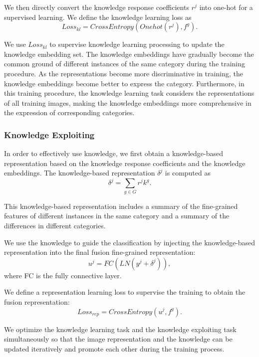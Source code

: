 \documentclass[5p,twocolumn]{elsarticle}
\begin{document}
We then directly convert the knowledge response coefficients $r^j$ into one-hot for a supervised learning. We define the knowledge learning loss as
\begin{equation}\label{equ.lossatte}
Loss_{kl} = CrossEntropy(Onehot(r^j), f^g ).
\end{equation}

We use $Loss_{kl}$ to supervise knowledge learning processing to update the knowledge embedding set.
The knowledge embeddings have gradually become the common ground of different instances of the same category during the training procedure. As the representations become more discriminative in training, the knowledge embeddings become better to express the category. Furthermore, in this training procedure, the knowledge learning task considers the representations of all training images, making the knowledge embeddings more comprehensive in the expression of corresponding categories.

\subsubsection{Knowledge Exploiting}
In order to effectively use knowledge, we first obtain a knowledge-based representation based on the knowledge response coefficients and the knowledge embeddings.
The knowledge-based representation $\delta^{j}$ is computed as 
\begin{equation}\label{equ.atteValue}
\delta^{j} = \sum_{g \in G}r^jk^{g}.
\end{equation}

This knowledge-based representation includes a summary of the fine-grained features of different instances in the same category and a summary of the differences in different categories.
 
We use the knowledge to guide the classification by injecting the knowledge-based representation  into the final fusion fine-grained representation:
\begin{equation}\label{equ.featFusion}
u^{j} = FC(LN(y^{j}+\delta^{j})),
\end{equation}
where FC is the fully connective layer.

We define a representation learning loss to supervise the training to obtain the fusion representation: 
\begin{equation}\label{equ.lossrep}
Loss_{rep} = CrossEntropy(u^j, f^g ).
\end{equation}

We optimize the knowledge learning task and the knowledge exploiting task simultaneously so that the image representation and the knowledge can be updated iteratively and promote each other during the training process.
\end{document}
